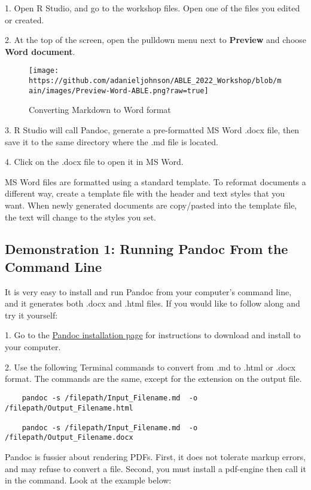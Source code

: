 \documentclass[
]{article}
\begin{document}
1. Open R Studio, and go to the workshop files. Open one of the files
you edited or created.

2. At the top of the screen, open the pulldown menu next to
\textbf{Preview} and choose \textbf{Word document}.

\begin{figure}
\centering
\texttt{[image: https://github.com/adanieljohnson/ABLE\_2022\_Workshop/blob/main/images/Preview-Word-ABLE.png?raw=true]}
\caption{Converting Markdown to Word format}
\end{figure}

3. R Studio will call Pandoc, generate a pre-formatted MS Word .docx
file, then save it to the same directory where the .md file is located.

4. Click on the .docx file to open it in MS Word.

MS Word files are formatted using a standard template. To reformat
documents a different way, create a template file with the header and
text styles that you want. When newly generated documents are
copy/pasted into the template file, the text will change to the styles
you set.

\hypertarget{demonstration-1-running-pandoc-from-the-command-line}{%
\subsection{Demonstration 1: Running Pandoc From the Command
Line}\label{demonstration-1-running-pandoc-from-the-command-line}}

It is very easy to install and run Pandoc from your computer's command
line, and it generates both .docx and .html files. If you would like to
follow along and try it yourself:

1. Go to the \href{https://pandoc.org/installing.html}{Pandoc
installation page} for instructions to download and install to your
computer.

2. Use the following Terminal commands to convert from .md to .html or
.docx format. The commands are the same, except for the extension on the
output file.

\begin{verbatim}
    pandoc -s /filepath/Input_Filename.md  -o /filepath/Output_Filename.html

    pandoc -s /filepath/Input_Filename.md  -o /filepath/Output_Filename.docx
\end{verbatim}

Pandoc is fussier about rendering PDFs. First, it does not tolerate
markup errors, and may refuse to convert a file. Second, you must
install a pdf-engine then call it in the command. Look at the example
below:
\end{document}
